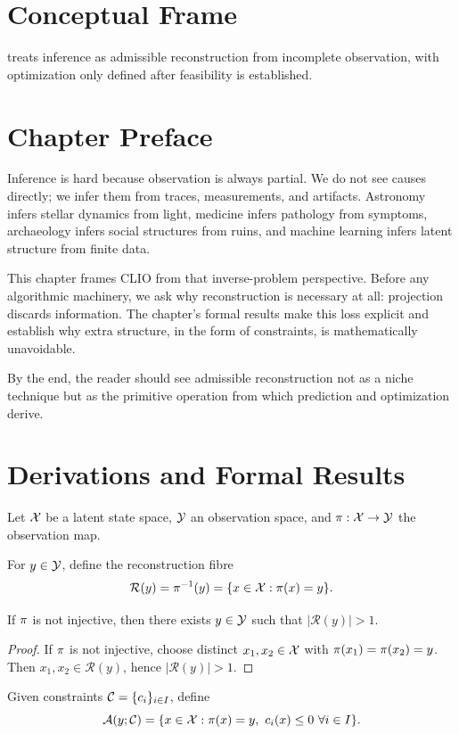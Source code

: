 \section{Conceptual Frame}
\CLIO treats inference as admissible reconstruction from incomplete observation, with optimization only defined after feasibility is established.

\section{Chapter Preface}
Inference is hard because observation is always partial. We do not see causes directly; we infer them from traces, measurements, and artifacts. Astronomy infers stellar dynamics from light, medicine infers pathology from symptoms, archaeology infers social structures from ruins, and machine learning infers latent structure from finite data.

This chapter frames CLIO from that inverse-problem perspective. Before any algorithmic machinery, we ask why reconstruction is necessary at all: projection discards information. The chapter's formal results make this loss explicit and establish why extra structure, in the form of constraints, is mathematically unavoidable.

By the end, the reader should see admissible reconstruction not as a niche technique but as the primitive operation from which prediction and optimization derive.

\section{Derivations and Formal Results}
\begin{definition}
Let \(\mathcal{X}\) be a latent state space, \(\mathcal{Y}\) an observation space, and \(\pi:\mathcal{X}\to\mathcal{Y}\) the observation map.
\end{definition}

\begin{definition}
For \(y\in\mathcal{Y}\), define the reconstruction fibre
\[
\mathcal R(y)=\pi^{-1}(y)=\{x\in\mathcal{X}:\pi(x)=y\}.
\]
\end{definition}

\begin{proposition}
\label{prop:non-unique-reconstruction}
If \(\pi\) is not injective, then there exists \(y\in\mathcal{Y}\) such that \(|\mathcal R(y)|>1\).
\end{proposition}

\begin{proof}
If \(\pi\) is not injective, choose distinct \(x_1,x_2\in\mathcal{X}\) with \(\pi(x_1)=\pi(x_2)=y\). Then \(x_1,x_2\in\mathcal R(y)\), hence \(|\mathcal R(y)|>1\).
\end{proof}

\begin{definition}
Given constraints \(\mathcal{C}=\{c_i\}_{i\in I}\), define
\[
\admissibleSet(y;\constraintSet)=\{x\in\stateSpace:\projection(x)=y,\ c_i(x)\le 0\ \forall i\in I\}.
\]
\end{definition}
